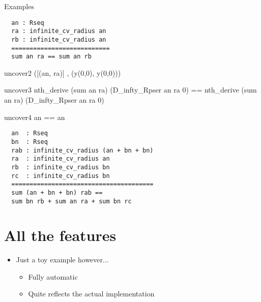 \documentclass{beamer}
\begin{document}
\begin{frame}[fragile]{Examples}

\begin{center}
\begin{minipage}{0.6\textwidth}
\begin{verbatim}
  an : Rseq
  ra : infinite_cv_radius an
  rb : infinite_cv_radius an
  ===========================
  sum an ra == sum an rb
\end{verbatim}
\end{minipage}
\end{center}

\bigskip

\begin{SaveVerbatim}{uncover2}
([(an, ra)] , (y(0,0), y(0,0)))
\end{SaveVerbatim}

\begin{SaveVerbatim}{uncover3}
  nth_derive (sum an ra) (D_infty_Rpser an ra 0) ==
  nth_derive (sum an ra) (D_infty_Rpser an ra 0)
\end{SaveVerbatim}

\begin{SaveVerbatim}{uncover4}
  an == an
\end{SaveVerbatim}



\end{frame}

\begin{frame}[fragile]
\begin{verbatim}
  an  : Rseq
  bn  : Rseq
  rab : infinite_cv_radius (an + bn + bn)
  ra  : infinite_cv_radius an
  rb  : infinite_cv_radius bn
  rc  : infinite_cv_radius bn
  =======================================
  sum (an + bn + bn) rab ==
  sum bn rb + sum an ra + sum bn rc
\end{verbatim}
\end{frame}

\section{All the features}

\begin{frame}
\begin{itemize}
  \item Just a toy example however...
  \begin{itemize}
    \item Fully automatic
    \item Quite reflects the actual implementation
  \end{itemize}
\end{itemize}
\end{frame}
\end{document}

